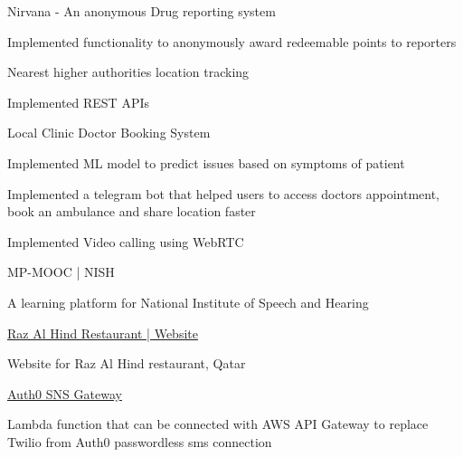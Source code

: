 \vspace{5mm}

\begin{cventries}
  \cventry
    {} 
    {Nirvana - An anonymous Drug reporting system}
    {}
    {} %
    {
      \begin{cvitems} %
		\item {Implemented functionality to anonymously award redeemable points to reporters}
        \item {Nearest higher authorities location tracking}
        \item {Implemented REST APIs}
      \end{cvitems}
    }

  \cventry
    {} %
    {Local Clinic Doctor Booking System} %
    {} %
    {} %
    {
      \begin{cvitems} %
      	\item {Implemented ML model to predict issues based on symptoms of patient}
		\item {Implemented a telegram bot that helped users to access doctors appointment, book an ambulance and share location faster}
        \item {Implemented Video calling using WebRTC}
      \end{cvitems}
    }

  \cventry
    {} %
    {MP-MOOC | NISH} %
    {} %
    {} %
    {
      \begin{cvitems} %
      	\item {A learning platform for National Institute of Speech and Hearing}
      \end{cvitems}
    }

  \cventry
    {} %
    {\hyperlink{https://www.razalhind.com}{Raz Al Hind Restaurant | Website}} %
    {} %
    {} %
    {
      \begin{cvitems} %
      	\item {Website for Raz Al Hind restaurant, Qatar}
      \end{cvitems}
    }

    \cventry
    {} %
    {\hyperlink{https://github.com/zameel7/auth0-sns-gateway}{Auth0 SNS Gateway}} %
    {} %
    {} %
    {
      \begin{cvitems} %
      	\item {Lambda function that can be connected with AWS API Gateway to replace Twilio from Auth0 passwordless sms connection}
      \end{cvitems}
    }


\end{cventries}
